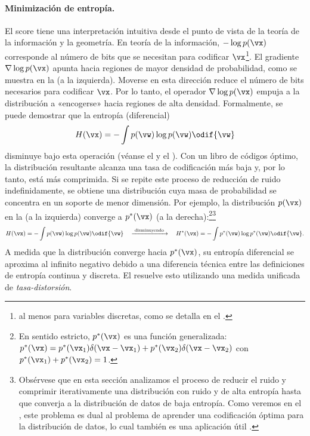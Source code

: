 \documentclass[../../book-main_es.tex]{subfiles}
\begin{document}
\paragraph{Minimización de entropía.} El score tiene una interpretación intuitiva
desde el punto de vista de la teoría de la información y la geometría. En teoría de la información,
\(-\log p(\vx)\) corresponde al número de bits que se necesitan para
codificar \(\vx\)\footnote{al menos para variables discretas, como se detalla
en el .}. El gradiente \(\nabla \log p(\vx)\) apunta
hacia regiones de mayor densidad de probabilidad, como se muestra en la
 (a la izquierda). Moverse en esta dirección reduce
el número de bits necesarios para codificar \(\vx\). Por lo tanto, el operador
\(\nabla \log p(\vx)\) empuja a la distribución a «encogerse» hacia
regiones de alta densidad. Formalmente, se puede demostrar que la entropía (diferencial)
\begin{equation}
    H(\vx) = - \int p(\vw) \log p(\vw) \odif{\vw}
\end{equation}
disminuye bajo esta operación (véanse el  y el
). Con un libro de códigos óptimo, la
distribución resultante alcanza una tasa de codificación más baja y, por lo tanto, está más
comprimida. Si se repite este proceso de reducción de ruido indefinidamente, se obtiene una
distribución cuya masa de probabilidad se concentra en un soporte de
menor dimensión. Por ejemplo, la distribución \(p(\vx)\) en la
 (a la izquierda) converge a \(p^{*}(\vx)\)
(a la derecha):\footnote{En sentido estricto, \(p^{*}(\vx)\) es una función generalizada:
    \(p^{*}(\vx) = p^{*}(\vx_{1})\delta(\vx-\vx_{1}) +
    p^{*}(\vx_{2}) \delta(\vx-\vx_{2})\) con \(p^{*}(\vx_{1}) +
p^{*}(\vx_{2}) = 1\).}\footnote{Obsérvese que en esta sección
    analizamos el proceso de reducir el ruido y comprimir iterativamente una
    distribución con ruido y de alta entropía hasta que converja a la distribución de datos de baja entropía.
    Como veremos en el , este
    problema es dual al problema de aprender una codificación óptima para
    la distribución de datos, lo cual también es una aplicación útil
\cite{relic2024lossy}.}
\begin{equation}
    \scalebox{0.85}{\(\displaystyle H(\vx) = - \int p(\vw) \log p(\vw)
            \odif{\vw} \quad
            \xrightarrow{\hspace{1mm} \text{disminuyendo} \hspace{1mm}} \quad
    H^{*}(\vx) = - \int p^{*}(\vw) \log p^{*}(\vw) \odif{\vw}.\)}
\end{equation}
A medida que la distribución converge hacia \(p^{*}(\vx)\), su entropía diferencial
se aproxima al infinito negativo debido a una diferencia técnica
entre las definiciones de entropía continua y discreta.
El  resuelve esto utilizando una medida unificada
de \textit{tasa-distorsión}.
\end{document}
